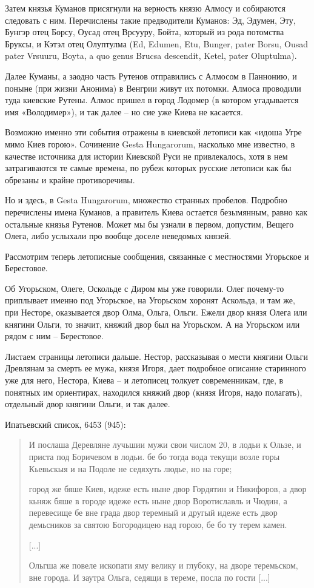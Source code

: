 Затем князья Куманов присягнули на верность князю Алмосу и собираются следовать с ним. Перечислены такие предводители Куманов: Эд, Эдумен, Эту, Бунгэр отец Борсу, Оусад отец Врсууру, Бойта, который из рода потомства Бруксы, и Кэтэл отец Олуптулма (Ed, Edumen, Etu, Bunger, pater Borsu, Ousad pater Vrsuuru, Boyta, a quo genus Brucsa descendit, Ketel, pater Oluptulma).

Далее Куманы, а заодно часть Рутенов отправились с Алмосом в Паннонию, и поныне (при жизни Анонима) в Венгрии живут их потомки. Алмоса проводили туда киевские Рутены. Алмос пришел в город Лодомер (в котором угадывается имя «Володимер»), и так 
далее – но сие уже Киева не касается. 

Возможно именно эти события отражены в киевской летописи как «идоша Угре мимо Киев горою». Сочинение Gesta Hungarorum, насколько мне известно, в качестве источника для истории Киевской Руси не привлекалось, хотя в нем затрагиваются те самые времена, по рубеж которых русские летописи как бы обрезаны и крайне противоречивы.

Но и здесь, в Gesta Hungarorum, множество странных пробелов. Подробно перечислены имена Куманов, а правитель Киева остается безымянным, равно как остальные князья Рутенов. Может мы бы узнали в первом, допустим, Вещего Олега, либо услыхали про вообще доселе неведомых князей.

Рассмотрим теперь летописные сообщения, связанные с местностями Угорьское и Берестовое.

Об Угорьском, Олеге, Оскольде с Диром мы уже говорили. Олег почему-то приплывает именно под Угорьское, на Угорьском хоронят Аскольда, и там же, при Несторе, оказывается двор Олма, Ольга, Ольги. Ежели двор князя Олега или княгини Ольги, то значит, княжий двор был на Угорьском. А на Угорьском или рядом с ним – Берестовое.

Листаем страницы летописи дальше. Нестор, рассказывая о мести княгини Ольги Древлянам за смерть ее мужа, князя Игоря, дает подробное описание старинного уже для него, Нестора, Киева – и летописец толкует современникам, где, в понятных им ориентирах, находился княжий двор (князя Игоря, надо полагать), отдельный двор княгини Ольги, и так далее.

Ипатьевский список, 6453 (945):

\begin{quotation}
И послаша Деревляне лучьшии мужи свои числом 20, в лодьи к Ользе, и приста под Боричевом в лодьи. бе бо тогда вода текущи возле горы Кьевьскыя и на Подоле не седяхуть людье, но на горе;

город же бяше Киев, идеже есть ныне двор Гордятин и Никифоров, а двор кьняж бяше в городе идеже есть ныне двор Воротиславль и Чюдин, а перевесище бе вне града двор теремный и другый идеже есть двор демьсников за святою Богородицею над горою, бе бо ту терем камен.

[...]

Ольгша же повеле ископати яму велику и глубоку, на дворе теремьском, вне города. И заутра Ольга, седящи в тереме, посла по гости [...]
\end{quotation}

